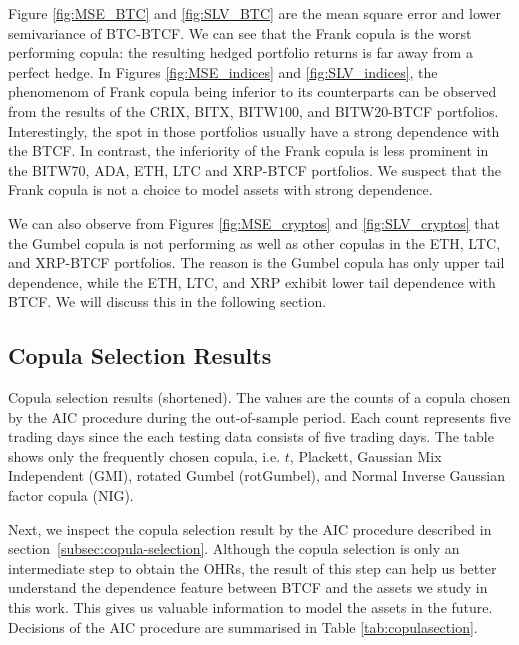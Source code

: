 Figure \ref{fig:MSE_BTC} and \ref{fig:SLV_BTC} are the mean square
error and lower semivariance of BTC-BTCF. We can see that the Frank copula
is the worst performing copula:
the resulting hedged portfolio returns is far away from a perfect
hedge.
In Figures \ref{fig:MSE_indices} and \ref{fig:SLV_indices}, the phenomenom
of Frank copula being inferior to its counterparts can be observed
from the results of the CRIX, BITX, BITW100, and BITW20-BTCF
portfolios.
Interestingly, the spot in those portfolios usually have a strong
dependence with the BTCF.
In contrast, the inferiority of the Frank copula is less prominent in
the BITW70, ADA, ETH, LTC and XRP-BTCF portfolios.
We suspect that the Frank copula is not a choice to model assets with
strong dependence.

We can also observe from Figures \ref{fig:MSE_cryptos} and
\ref{fig:SLV_cryptos} that the Gumbel copula is not performing as well as
other copulas in the ETH, LTC, and XRP-BTCF portfolios.
The reason is the Gumbel copula has only upper tail dependence,
while the ETH, LTC, and XRP exhibit lower tail dependence with BTCF.
We will discuss this in the following section.

\subsection{Copula Selection Results}\label{subsec:-copula-results}
\begin{table}[t]

 \caption{Copula selection results (shortened).
        The values are the counts of a copula chosen by the AIC procedure during the out-of-sample period.
        Each count represents five trading days since the each testing data consists of five trading days.
        The table shows only the frequently chosen copula, i.e. $t$, Plackett, Gaussian Mix Independent (GMI), rotated Gumbel (rotGumbel), and
        Normal Inverse Gaussian factor copula (NIG).
        }
    \label{tab:copulasection}
\end{table}
Next, we inspect the copula selection result by the AIC procedure described in section~\ref{subsec:copula-selection}.
Although the copula selection is only an intermediate step to obtain the OHRs,
the result of this step can help us better understand the dependence
feature between BTCF and the assets we study in this work.
This gives us valuable information to model the assets in the future.
Decisions of the AIC procedure are summarised in Table \ref{tab:copulasection}. \medskip

